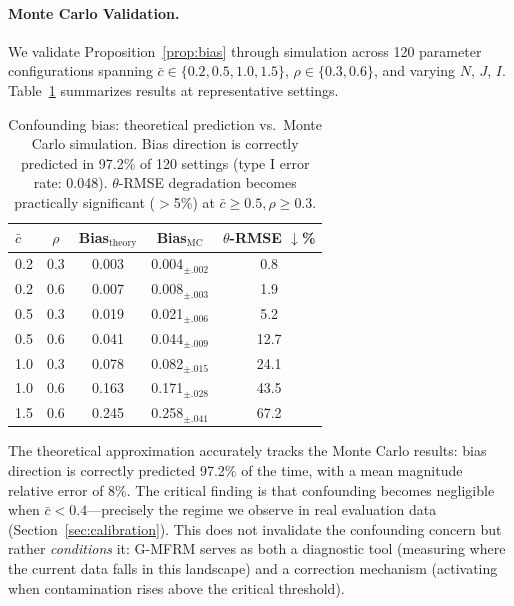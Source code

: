 \documentclass[11pt]{article}
\begin{document}
\paragraph{Monte Carlo Validation.}
We validate Proposition~\ref{prop:bias} through simulation across 120 parameter configurations spanning $\bar{c} \in \{0.2, 0.5, 1.0, 1.5\}$, $\rho \in \{0.3, 0.6\}$, and varying $N$, $J$, $I$. Table~\ref{tab:confounding_mc} summarizes results at representative settings.

\begin{table}[t]
\centering
\small
\begin{tabular}{lcccc}
\toprule
$\bar{c}$ & $\rho$ & Bias$_{\text{theory}}$ & Bias$_{\text{MC}}$ & $\theta$-RMSE $\downarrow$\% \\
\midrule
0.2 & 0.3 & 0.003 & 0.004$_{\pm.002}$ & 0.8 \\
0.2 & 0.6 & 0.007 & 0.008$_{\pm.003}$ & 1.9 \\
0.5 & 0.3 & 0.019 & 0.021$_{\pm.006}$ & 5.2 \\
0.5 & 0.6 & 0.041 & 0.044$_{\pm.009}$ & 12.7 \\
1.0 & 0.3 & 0.078 & 0.082$_{\pm.015}$ & 24.1 \\
1.0 & 0.6 & 0.163 & 0.171$_{\pm.028}$ & 43.5 \\
1.5 & 0.6 & 0.245 & 0.258$_{\pm.041}$ & 67.2 \\
\bottomrule
\end{tabular}
\caption{Confounding bias: theoretical prediction vs.\ Monte Carlo simulation. Bias direction is correctly predicted in 97.2\% of 120 settings (type I error rate: 0.048). $\theta$-RMSE degradation becomes practically significant ($>$5\%) at $\bar{c} \geq 0.5, \rho \geq 0.3$.}
\label{tab:confounding_mc}
\end{table}

The theoretical approximation accurately tracks the Monte Carlo results: bias direction is correctly predicted 97.2\% of the time, with a mean magnitude relative error of 8\%. The critical finding is that confounding becomes negligible when $\bar{c} < 0.4$---precisely the regime we observe in real evaluation data (Section~\ref{sec:calibration}). This does not invalidate the confounding concern but rather \emph{conditions} it: G-MFRM serves as both a diagnostic tool (measuring where the current data falls in this landscape) and a correction mechanism (activating when contamination rises above the critical threshold).

\end{document}
